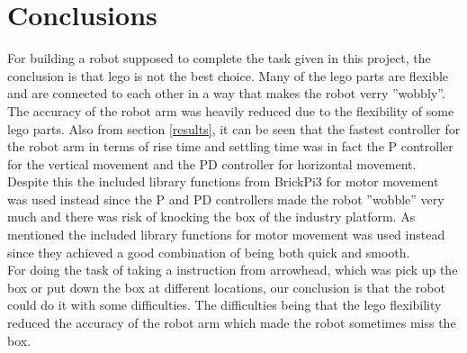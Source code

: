 \section{Conclusions}
For building a robot supposed to complete the task given in this project, the conclusion is that lego is not the best choice. Many of the lego parts are flexible and are connected to each other in a way that makes the robot verry ''wobbly''. The accuracy of the robot arm was heavily reduced due to the flexibility of some lego parts. Also from section \ref{results}, it can be seen that the fastest controller for the robot arm in terms of rise time and settling time was in fact the P controller for the vertical movement and the PD controller for horizontal movement. Despite this the included library functions from BrickPi3 for motor movement was used instead since the P and PD controllers made the robot ''wobble'' very much and there was risk of knocking the box of the industry platform. As mentioned the included library functions for motor movement was used instead since they achieved a good combination of being both quick and smooth.\\
For doing the task of taking a instruction from arrowhead, which was pick up the box or put down the box at different locations, our conclusion is that the robot could do it with some difficulties. The difficulties being that the lego flexibility reduced the accuracy of the robot arm which made the robot sometimes miss the box.

